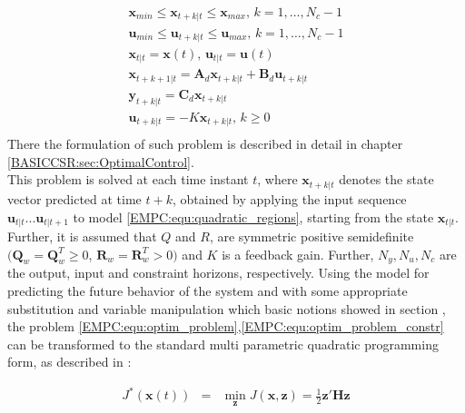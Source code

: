     \begin{equation}
        \begin{array}{l}
            \textbf{x}_{min}\leq\textbf{x}_{t+k|t}\leq\textbf{x}_{max},\,k=1,\dots,N_c-1\\
            \textbf{u}_{min}\leq\textbf{u}_{t+k|t}\leq\textbf{u}_{max},\,k=1,\dots,N_c-1\\
            \textbf{x}_{t|t}=\textbf{x}(t),\,\textbf{u}_{t|t}=\textbf{u}(t)\\
            \textbf{x}_{t+k+1|t}=\textbf{A}_d\textbf{x}_{t+k|t}+\textbf{B}_d\textbf{u}_{t+k|t}\\
            \textbf{y}_{t+k|t}=\textbf{C}_d\textbf{x}_{t+k|t}\\
            \textbf{u}_{t+k|t}=-K\textbf{x}_{t+k|t},\,k\geq0\\
        \end{array}
        \label{EMPC:equ:optim_problem_constr}
    \end{equation}
There the formulation of such problem is described in detail in chapter \ref{BASICCSR:sec:OptimalControl}.\\
    This problem is solved at each time instant $t$, where $\textbf{x}_{t+k\vert t}$ denotes the state vector predicted at time $t+k$, obtained by applying the input sequence $\textbf{u}_{t|t}...\textbf{u}_{t|t+1}$ to model \ref{EMPC:equ:quadratic_regions}, starting from the state $\textbf{x}_{t|t}$. Further, it is assumed that $Q$ and $R$, are symmetric positive semidefinite $(\textbf{Q}_w=\textbf{Q}_w^T\geq0$, $\textbf{R}_w=\textbf{R}_w^T>0)$ and $K$ is a feedback gain. Further, $N_y,N_u,N_c$ are the output, input and constraint horizons, respectively.
    Using the model for predicting the future behavior of the system and with some appropriate substitution and variable manipulation which basic notions showed in section , the problem \ref{EMPC:equ:optim_problem},\ref{EMPC:equ:optim_problem_constr} can be transformed to the standard multi parametric quadratic programming form, as described in \cite{rivera2013predictive}:
%

    \begin{equation}
        \begin{array}{rcl}
            J^*(\textbf{x}(t))&=&\min_{\textbf{z}}J(\textbf{x},\textbf{z})=\frac{1}{2}\textbf{z}'\textbf{H}\textbf{z}
        \end{array}
        \label{EMPC:equ:quadratic_program}
    \end{equation}

